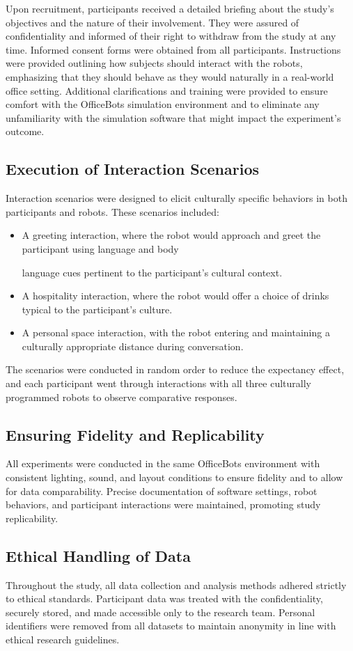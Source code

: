 Upon recruitment, participants received a detailed briefing about the study's objectives and the nature of their involvement. They were assured of confidentiality and informed of their right to withdraw from the study at any time. Informed consent forms were obtained from all participants. Instructions were provided outlining how subjects should interact with the robots, emphasizing that they should behave as they would naturally in a real-world office setting. Additional clarifications and training were provided to ensure comfort with the OfficeBots simulation environment and to eliminate any unfamiliarity with the simulation software that might impact the experiment's outcome.

\subsection{Execution of Interaction Scenarios}

Interaction scenarios were designed to elicit culturally specific behaviors in both participants and robots. These scenarios included:

\begin{itemize}
    \item A greeting interaction, where the robot would approach and greet the participant using language and body

 language cues pertinent to the participant's cultural context.
    \item A hospitality interaction, where the robot would offer a choice of drinks typical to the participant's culture.
    \item A personal space interaction, with the robot entering and maintaining a culturally appropriate distance during conversation.
\end{itemize}

The scenarios were conducted in random order to reduce the expectancy effect, and each participant went through interactions with all three culturally programmed robots to observe comparative responses.

\subsection{Ensuring Fidelity and Replicability}

All experiments were conducted in the same OfficeBots environment with consistent lighting, sound, and layout conditions to ensure fidelity and to allow for data comparability. Precise documentation of software settings, robot behaviors, and participant interactions were maintained, promoting study replicability.

\subsection{Ethical Handling of Data}

Throughout the study, all data collection and analysis methods adhered strictly to ethical standards. Participant data was treated with the confidentiality, securely stored, and made accessible only to the research team. Personal identifiers were removed from all datasets to maintain anonymity in line with ethical research guidelines.


